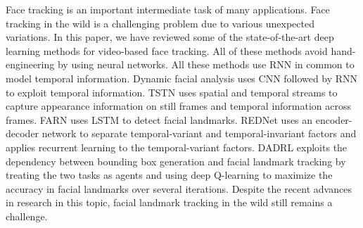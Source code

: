 \documentclass{llncs}
\begin{document}
	Face tracking is an important intermediate task of many applications. Face tracking in the wild is a challenging problem due to various unexpected variations. In this paper, we have reviewed some of the state-of-the-art deep learning methods for video-based face tracking. All of these methods avoid hand-engineering by using neural networks. All these methods use RNN in common to model temporal information. Dynamic facial analysis\cite{dynamic_facial_analysis} uses CNN followed by RNN to exploit temporal information. TSTN\cite{tstn} uses spatial and temporal streams to capture appearance information on still frames and temporal information across frames. FARN\cite{farn} uses LSTM to detect facial landmarks. REDNet\cite{rednet} uses an encoder-decoder network to separate temporal-variant and temporal-invariant factors and applies recurrent learning to the temporal-variant factors. DADRL \cite{dadrl} exploits the dependency between bounding box generation and facial landmark tracking by treating the two tasks as agents and using deep Q-learning to maximize the accuracy in facial landmarks over several iterations. Despite the recent advances in research in this topic, facial landmark tracking in the wild still remains a challenge.
	
	\vspace{-3mm}
	
	
	
	
\end{document}
